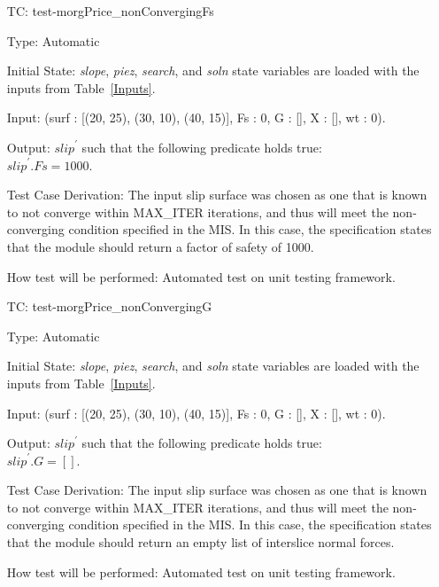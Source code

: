 \documentclass[12pt, titlepage]{article}
\newcounter{utestnum} %
\begin{document}
\begin{enumerate}[label=TC\arabic*:,ref={\arabic*}]
	
	\item [TC\refstepcounter{utestnum}\theutestnum: 
	\label{TC_MorgPriceNonConvergingFs}] 
	test-morgPrice\_nonConvergingFs
	
	Type: Automatic
	
	Initial State: \textit{slope}, \textit{piez}, \textit{search}, and 
	\textit{soln} state variables are loaded with the inputs from 
	Table~\ref{Inputs}.
	
	Input: (surf : [(20, 25), (30, 10), (40, 15)], Fs : 0, G : [], X : [], wt : 
	0).
	
	Output: $\textit{slip}^\prime$ such that the following predicate holds 
	true:\\ 
	$\textit{slip}^\prime.\textit{Fs} = 1000$.
	
	Test Case Derivation: The input slip surface was chosen as one that is 
	known to not converge within MAX\_ITER iterations, and thus will meet the 
	non-converging condition specified in the MIS. In this case, the 
	specification states that the module should return a factor of safety of 
	1000.
	
	How test will be performed: Automated test on unit testing framework.
	
	\item [TC\refstepcounter{utestnum}\theutestnum: 
	\label{TC_MorgPriceNonConvergingG}] 
	test-morgPrice\_nonConvergingG
	
	Type: Automatic
	
	Initial State: \textit{slope}, \textit{piez}, \textit{search}, and 
	\textit{soln} state variables are loaded with the inputs from 
	Table~\ref{Inputs}.
	
	Input: (surf : [(20, 25), (30, 10), (40, 15)], Fs : 0, G : [], X : [], wt : 
	0).
	
	Output: $\textit{slip}^\prime$ such that the following predicate holds 
	true:\\ 
	$\textit{slip}^\prime.\textit{G} = []$.
	
	Test Case Derivation: The input slip surface was chosen as one that is 
	known to not converge within MAX\_ITER iterations, and thus will meet the 
	non-converging condition specified in the MIS. In this case, the 
	specification states that the module should return an empty list of 
	interslice normal forces.
	
	How test will be performed: Automated test on unit testing framework.
	

\end{enumerate}
\end{document}
